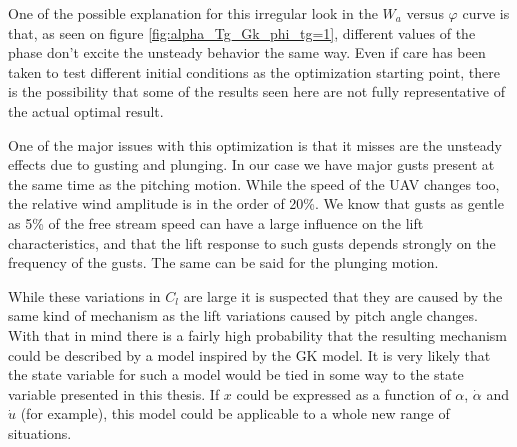 \par One of the possible explanation for this irregular look in the $W_a$ versus $\varphi$ curve is that, as seen on figure \ref{fig:alpha_Tg_Gk_phi_tg=1}, different values of the phase don't excite the unsteady behavior the same way.
Even if care has been taken to test different initial conditions as the optimization starting point, there is the possibility that some of the results seen here are not fully representative of the actual optimal result.

\FloatBarrier
{}

One of the major issues with this optimization is that it misses are the unsteady effects due to gusting and plunging.
In our case we have major gusts present at the same time as the pitching motion.
While the speed of the UAV changes too, the relative wind amplitude is in the order of 20\%.
We know that gusts as gentle as 5\% of the free stream speed can have a large influence on the lift characteristics, and that the lift response to such gusts depends strongly on the frequency of the gusts.
The same can be said for the plunging motion.

\par While these variations in $C_l$ are large it is suspected that they are caused by the same kind of mechanism as the lift variations caused by pitch angle changes.
With that in mind there is a fairly high probability that the resulting mechanism could be described by a model inspired by the GK model.
It is very likely that the state variable for such a model would be tied in some way to the state variable presented in this thesis.
If $x$ could be expressed as a function of $\alpha$, $\dot{\alpha}$ and $\dot{u}$ (for example), this model could be applicable to a whole new range of situations.

